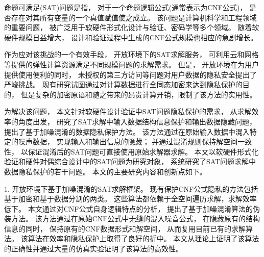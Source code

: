 \begin{cabstract}
命题可满足(SAT)问题是指，
对于一个命题逻辑公式(通常表示为CNF公式)，
是否存在对其所有变量的一个真值赋值使之成立。
该问题是计算机科学和工程领域的重要问题，
被广泛用于软硬件形式化设计与验证、密码学等多个领域。
随着软硬件规模日益增大，
设计和验证过程中生成的CNF公式规模也相应的急剧增长。

作为应对该挑战的一个有效手段，
开放环境下的SAT求解服务，
可利用云和网格等提供的弹性计算资源满足不同规模问题的求解需求。
但是，
开放环境在为用户提供使用便利的同时，
未授权的第三方访问等问题对用户数据的隐私安全提出了严峻挑战。
现有研究试图通过对计算数据进行全同态加密来达到隐私保护的目的，
但是复杂的加密原语和随之带来的昂贵计算开销，限制了该方法的实用性。

为解决该问题，
本文针对软硬件设计验证中SAT问题隐私保护的需求，
从求解效率的角度出发，
研究了SAT求解中输入数据结构信息保护和输出数据隐藏问题，
提出了基于加噪混淆的数据隐私保护方法。
该方法通过在原始输入数据中混入特定的噪声数据，
实现输入和输出信息的隐藏；
并通过混淆规则保持解空间一致性，
以保证混淆后的SAT问题可直接使用原始求解器求解。
本文以软硬件形式化验证和硬件对偶综合设计中的SAT问题为研究对象，
系统研究了SAT问题求解中数据隐私保护的若干问题。
本文的主要研究内容和创新点如下。

1. 开放环境下基于加噪混淆的SAT求解框架。
现有保护CNF公式隐私的方法包括基于加密和基于数据分割的两类。
这些算法都依赖于全空间遍历求解，求解效率低下。
本文通过对CNF公式自身逻辑特点的分析，
提出了基于加噪混淆算法的伪装方法。
该方法通过在原始CNF公式中无缝的混入噪音公式，
在隐藏原有的结构信息的同时，
保持原有的CNF数据形式和解空间，
从而复用目前已有的求解算法。
该算法在效率和隐私保护上取得了良好的折中。
本文从理论上证明了该算法的正确性并通过大量的仿真实验证明了该算法的高效性。


\end{cabstract}

